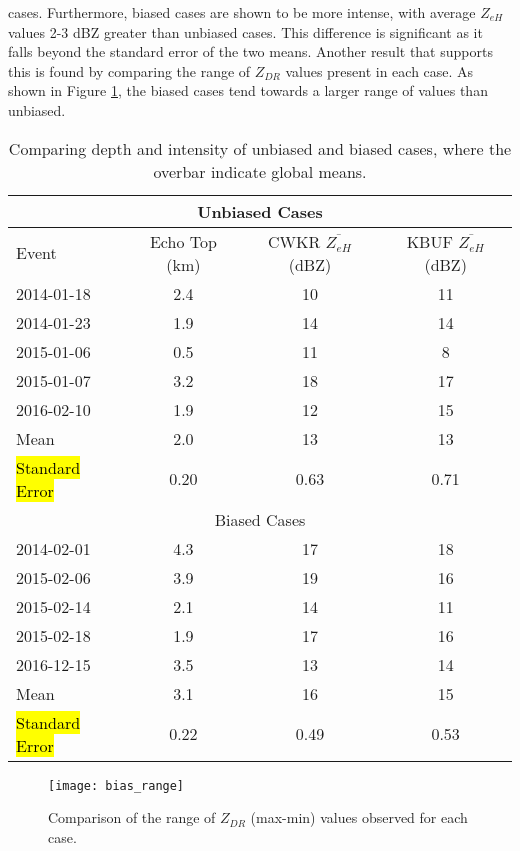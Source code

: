  cases. Furthermore, biased cases are shown to be more intense, with average $Z_{eH}$ values 2-3 dBZ greater 
 than unbiased cases. This difference is significant as it falls beyond the standard error of the two means. 
Another result that supports this is found by comparing the range of $Z_{DR}$ values present in each case. As 
shown in Figure \ref{fig:bias_range}, the biased cases tend towards a larger range of values than unbiased. 
\begin{table}[H]
    \caption{Comparing depth and intensity of unbiased and biased cases, where the overbar indicate global means.}\label{diagnosebias}
    \begin{center}
    \begin{tabular}{|l|c|c|c|}
    \hline
    \multicolumn{4}{|c|}{Unbiased Cases} \\
    \hline
     Event & Echo Top (km) & CWKR $\overline{Z_{eH}}$ (dBZ) & KBUF $\overline{Z_{eH}}$ (dBZ)\\
    \hline\hline
    2014-01-18 & 2.4 & 10 & 11 \\
    \hline
    2014-01-23 & 1.9 & 14 & 14 \\
    \hline
    2015-01-06 & 0.5 & 11 & 8 \\
    \hline
    2015-01-07 & 3.2 & 18 & 17 \\ 
    \hline
    2016-02-10 & 1.9 & 12 & 15 \\ 
    \hline\hline
    Mean & 2.0 & 13 & 13 \\
    \hline
    \hl{Standard Error} & 0.20 & 0.63 & 0.71 \\
    \hline
    \multicolumn{4}{|c|}{Biased Cases} \\
    \hline\hline
    2014-02-01 & 4.3 & 17 & 18\\
    \hline
    2015-02-06 & 3.9 & 19 & 16\\
    \hline
    2015-02-14 & 2.1 & 14 & 11\\
    \hline
    2015-02-18 & 1.9 & 17 & 16\\ 
    \hline
    2016-12-15 & 3.5 & 13 & 14  \\ 
    \hline\hline
    Mean & 3.1 & 16 & 15 \\
    \hline
    \hl{Standard Error} & 0.22 & 0.49 & 0.53 \\
    \hline
    \end{tabular}
    \end{center}
\end{table}

\begin{figure}[H]
\centering
\texttt{[image: bias\_range]}
\caption{Comparison of the range of $Z_{DR}$ (max-min) values observed for each case.} 
\label{fig:bias_range}
\end{figure}
